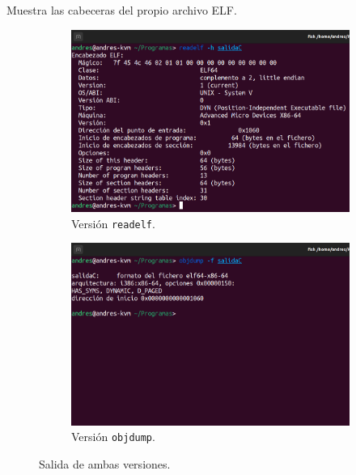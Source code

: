 \documentclass{article}
\begin{document}
\begin{itemize}
    Muestra las cabeceras del propio archivo ELF.

    \begin{figure}[H]
        \centering
        \begin{subfigure}{0.49\textwidth}
            \centering
            \includegraphics[width=\textwidth]{imagenes/Captura desde 2022-11-17 17-44-04.png}
            \caption{Versión \texttt{readelf}.}
        \end{subfigure}
        \hfill
        \begin{subfigure}{0.49\textwidth}
            \centering
            \includegraphics[width=\textwidth]{imagenes/Captura desde 2022-11-17 17-44-19.png}
            \caption{Versión \texttt{objdump}.}
        \end{subfigure}
        \caption{Salida de ambas versiones.}
    \end{figure}


\end{itemize}
\end{document}
